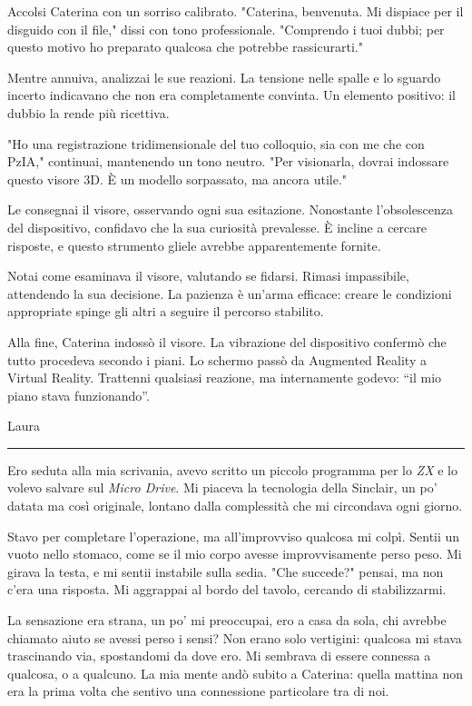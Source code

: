 Accolsi Caterina con un sorriso calibrato. "Caterina, benvenuta. Mi dispiace per il disguido con il file," dissi con tono professionale. "Comprendo i tuoi dubbi; per questo motivo ho preparato qualcosa che potrebbe rassicurarti."

Mentre annuiva, analizzai le sue reazioni. La tensione nelle spalle e lo sguardo incerto indicavano che non era completamente convinta. Un elemento positivo: il dubbio la rende più ricettiva.

"Ho una registrazione tridimensionale del tuo colloquio, sia con me che con PzIA," continuai, mantenendo un tono neutro. "Per visionarla, dovrai indossare questo visore 3D. È un modello sorpassato, ma ancora utile."

Le consegnai il visore, osservando ogni sua esitazione. Nonostante l'obsolescenza del dispositivo, confidavo che la sua curiosità prevalesse. È incline a cercare risposte, e questo strumento gliele avrebbe apparentemente fornite.

Notai come esaminava il visore, valutando se fidarsi. Rimasi impassibile, attendendo la sua decisione. La pazienza è un'arma efficace: creare le condizioni appropriate spinge gli altri a seguire il percorso stabilito.

Alla fine, Caterina indossò il visore. La vibrazione del dispositivo confermò che tutto procedeva secondo i piani. Lo schermo passò da Augmented Reality a Virtual Reality. Trattenni qualsiasi reazione, ma internamente godevo: ``il mio piano stava funzionando''.


\vspace{1em}
\begin{center}Laura\end{center}
\hrule
\vspace{1em}

Ero seduta alla mia scrivania, avevo scritto un piccolo programma per  lo \emph{ZX}  e lo volevo salvare sul \emph{Micro Drive}.  Mi piaceva la tecnologia della Sinclair, un po' datata ma così originale, lontano dalla complessità che mi circondava ogni giorno.

Stavo per completare l’operazione, ma all’improvviso qualcosa mi colpì. Sentii un vuoto nello stomaco, come se il mio corpo avesse improvvisamente perso peso. Mi girava la testa, e mi sentii instabile sulla sedia. "Che succede?" pensai, ma non c’era una risposta. Mi aggrappai al bordo del tavolo, cercando di stabilizzarmi.

La sensazione era strana, un po' mi preoccupai, ero a casa da sola, chi avrebbe chiamato aiuto se avessi perso i sensi? Non erano solo vertigini: qualcosa mi stava trascinando via, spostandomi da dove ero. Mi sembrava di essere connessa a qualcosa, o a qualcuno. La mia mente andò subito a Caterina: quella mattina non era la prima volta che sentivo una connessione particolare tra di noi.

